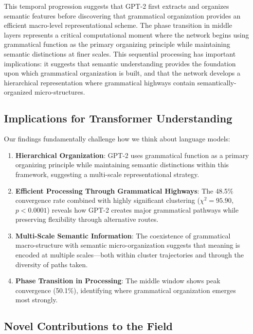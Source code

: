 This temporal progression suggests that GPT-2 first extracts and organizes semantic features before discovering that grammatical organization provides an efficient macro-level representational scheme. The phase transition in middle layers represents a critical computational moment where the network begins using grammatical function as the primary organizing principle while maintaining semantic distinctions at finer scales. This sequential processing has important implications: it suggests that semantic understanding provides the foundation upon which grammatical organization is built, and that the network develops a hierarchical representation where grammatical highways contain semantically-organized micro-structures.

\subsection{Implications for Transformer Understanding}

Our findings fundamentally challenge how we think about language models:

\begin{enumerate}
    \item \textbf{Hierarchical Organization}: GPT-2 uses grammatical function as a primary organizing principle while maintaining semantic distinctions within this framework, suggesting a multi-scale representational strategy.
    
    \item \textbf{Efficient Processing Through Grammatical Highways}: The 48.5\% convergence rate combined with highly significant clustering ($\chi^2 = 95.90$, $p < 0.0001$) reveals how GPT-2 creates major grammatical pathways while preserving flexibility through alternative routes.
    
    \item \textbf{Multi-Scale Semantic Information}: The coexistence of grammatical macro-structure with semantic micro-organization suggests that meaning is encoded at multiple scales—both within cluster trajectories and through the diversity of paths taken.
    
    \item \textbf{Phase Transition in Processing}: The middle window shows peak convergence (50.1\%), identifying where grammatical organization emerges most strongly.
\end{enumerate}

\subsection{Novel Contributions to the Field}

